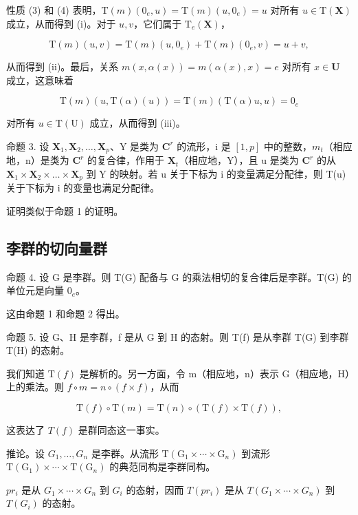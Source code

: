 性质 (3) 和 (4) 表明，\(\mathrm{T}(m)(0_e,u) = \mathrm{T}(m)(u,0_e) = u\) 对所有 \(u\in \mathrm{T}(\mathbf{X})\) 成立，从而得到 (i)。对于 \(u,v\)，它们属于 \(\mathrm{T}_e(\mathbf{X})\)，

\[
\mathrm{T} (m) (u, v) = \mathrm{T} (m) (u, 0 _ {e}) + \mathrm{T} (m) (0 _ {e}, v) = u + v,
\]

从而得到 (ii)。最后，关系 \(m(x, \alpha(x)) = m(\alpha(x), x) = e\) 对所有 \(x \in \mathbf{U}\) 成立，这意味着

\[
\mathrm{T} (m) (u, \mathrm{T} (\alpha) (u)) = \mathrm{T} (m) (\mathrm{T} (\alpha) u, u) = 0 _ {e}
\]

对所有 \(u \in \mathrm{T}(\mathrm{U})\) 成立，从而得到 (iii)。

命题 3. 设 \(\mathbf{X}_1, \mathbf{X}_2, \ldots, \mathbf{X}_p\)、Y 是类为 \(\mathbf{C}^r\) 的流形，i 是 \([1, p]\) 中的整数，\(m_t\)（相应地，n）是类为 \(\mathbf{C}^r\) 的复合律，作用于 \(\mathbf{X}_t\)（相应地，Y），且 u 是类为 \(\mathbf{C}^r\) 的从 \(\mathbf{X}_1 \times \mathbf{X}_2 \times \dots \times \mathbf{X}_p\) 到 Y 的映射。若 u 关于下标为 i 的变量满足分配律，则 T(u) 关于下标为 i 的变量也满足分配律。

证明类似于命题 1 的证明。

\subsection{李群的切向量群}

命题 4. 设 G 是李群。则 T(G) 配备与 G 的乘法相切的复合律后是李群。T(G) 的单位元是向量 \(0_{e}\)。

这由命题 1 和命题 2 得出。

命题 5. 设 G、H 是李群，f 是从 G 到 H 的态射。则 T(f) 是从李群 T(G) 到李群 T(H) 的态射。

我们知道 \(\mathrm{T}(f)\) 是解析的。另一方面，令 m（相应地，n）表示 G（相应地，H）上的乘法。则 \(f \circ m = n \circ (f \times f)\)，从而

\[
\mathrm{T} (f) \circ \mathrm{T} (m) = \mathrm{T} (n) \circ (\mathrm{T} (f) \times \mathrm{T} (f)),
\]

这表达了 \(T(f)\) 是群同态这一事实。

推论。设 \(G_{1},\ldots,G_{n}\) 是李群。从流形 \(\mathrm{T}(\mathrm{G}_{1}\times\cdots\times\mathrm{G}_{n})\) 到流形 \(\mathrm{T}(\mathrm{G}_{1})\times\cdots\times\mathrm{T}(\mathrm{G}_{n})\) 的典范同构是李群同构。

\(pr_{i}\) 是从 \(G_{1} \times \cdots \times G_{n}\) 到 \(G_{i}\) 的态射，因而 \(T(pr_{i})\) 是从 \(T(G_{1} \times \cdots \times G_{n})\) 到 \(T(G_{i})\) 的态射。


